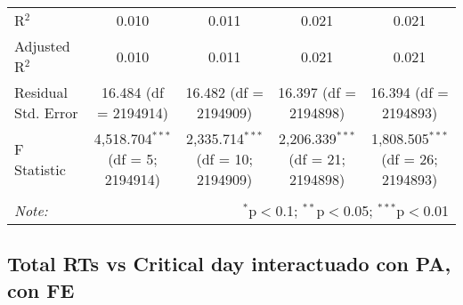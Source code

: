 \documentclass[
]{article}
\begin{document}
\begin{table}[!htbp]
{\begin{tabular}{@{\extracolsep{5pt}}lcccc}
R$^{2}$ & 0.010 & 0.011 & 0.021 & 0.021 \\ 
Adjusted R$^{2}$ & 0.010 & 0.011 & 0.021 & 0.021 \\ 
Residual Std. Error & 16.484 (df = 2194914) & 16.482 (df = 2194909) & 16.397 (df = 2194898) & 16.394 (df = 2194893) \\ 
F Statistic & 4,518.704$^{***}$ (df = 5; 2194914) & 2,335.714$^{***}$ (df = 10; 2194909) & 2,206.339$^{***}$ (df = 21; 2194898) & 1,808.505$^{***}$ (df = 26; 2194893) \\ 
\hline 
\hline \\[-1.8ex] 
\textit{Note:}  & \multicolumn{4}{r}{$^{*}$p$<$0.1; $^{**}$p$<$0.05; $^{***}$p$<$0.01} \\ 
\end{tabular}
} 
\end{table} 
\newpage
\subsection{Total RTs vs Critical day interactuado con PA, con FE}
\end{document}
